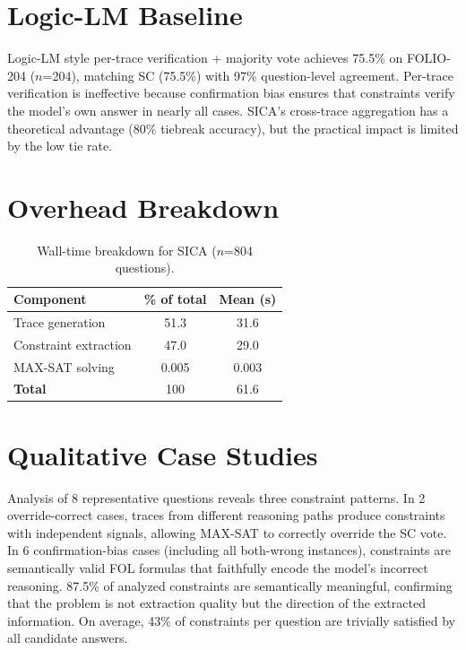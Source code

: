 \documentclass[11pt,a4paper]{article}
\begin{document}
\section{Logic-LM Baseline}
\label{app:logiclm}

Logic-LM style per-trace verification + majority vote achieves 75.5\% on FOLIO-204 ($n$=204), matching SC (75.5\%) with 97\% question-level agreement. Per-trace verification is ineffective because confirmation bias ensures that constraints verify the model's own answer in nearly all cases. SICA's cross-trace aggregation has a theoretical advantage (80\% tiebreak accuracy), but the practical impact is limited by the low tie rate.

\section{Overhead Breakdown}
\label{app:overhead}

\begin{table}[h]
\centering
\small
\caption{Wall-time breakdown for SICA ($n$=804 questions).}
\label{tab:overhead}
\begin{tabular}{lcc}
\toprule
\textbf{Component} & \textbf{\% of total} & \textbf{Mean (s)} \\
\midrule
Trace generation & 51.3 & 31.6 \\
Constraint extraction & 47.0 & 29.0 \\
MAX-SAT solving & 0.005 & 0.003 \\
\midrule
\textbf{Total} & 100 & 61.6 \\
\bottomrule
\end{tabular}
\end{table}

\section{Qualitative Case Studies}
\label{app:cases}

Analysis of 8 representative questions reveals three constraint patterns. In 2 override-correct cases, traces from different reasoning paths produce constraints with independent signals, allowing MAX-SAT to correctly override the SC vote. In 6 confirmation-bias cases (including all both-wrong instances), constraints are semantically valid FOL formulas that faithfully encode the model's incorrect reasoning. 87.5\% of analyzed constraints are semantically meaningful, confirming that the problem is not extraction quality but the direction of the extracted information. On average, 43\% of constraints per question are trivially satisfied by all candidate answers.
\end{document}
